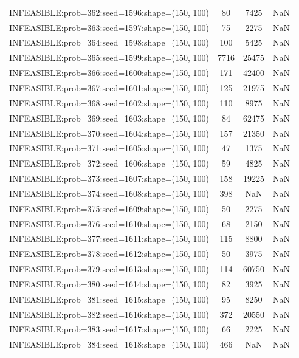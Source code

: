 \begin{longtable}{lccc}
INFEASIBLE:prob=362:seed=1596:shape=(150, 100) &    80 &  7425 &    NaN \\
INFEASIBLE:prob=363:seed=1597:shape=(150, 100) &    75 &  2275 &    NaN \\
INFEASIBLE:prob=364:seed=1598:shape=(150, 100) &   100 &  5425 &    NaN \\
INFEASIBLE:prob=365:seed=1599:shape=(150, 100) &  7716 & 25475 &    NaN \\
INFEASIBLE:prob=366:seed=1600:shape=(150, 100) &   171 & 42400 &    NaN \\
INFEASIBLE:prob=367:seed=1601:shape=(150, 100) &   125 & 21975 &    NaN \\
INFEASIBLE:prob=368:seed=1602:shape=(150, 100) &   110 &  8975 &    NaN \\
INFEASIBLE:prob=369:seed=1603:shape=(150, 100) &    84 & 62475 &    NaN \\
INFEASIBLE:prob=370:seed=1604:shape=(150, 100) &   157 & 21350 &    NaN \\
INFEASIBLE:prob=371:seed=1605:shape=(150, 100) &    47 &  1375 &    NaN \\
INFEASIBLE:prob=372:seed=1606:shape=(150, 100) &    59 &  4825 &    NaN \\
INFEASIBLE:prob=373:seed=1607:shape=(150, 100) &   158 & 19225 &    NaN \\
INFEASIBLE:prob=374:seed=1608:shape=(150, 100) &   398 &   NaN &    NaN \\
INFEASIBLE:prob=375:seed=1609:shape=(150, 100) &    50 &  2275 &    NaN \\
INFEASIBLE:prob=376:seed=1610:shape=(150, 100) &    68 &  2150 &    NaN \\
INFEASIBLE:prob=377:seed=1611:shape=(150, 100) &   115 &  8800 &    NaN \\
INFEASIBLE:prob=378:seed=1612:shape=(150, 100) &    50 &  3975 &    NaN \\
INFEASIBLE:prob=379:seed=1613:shape=(150, 100) &   114 & 60750 &    NaN \\
INFEASIBLE:prob=380:seed=1614:shape=(150, 100) &    82 &  3925 &    NaN \\
INFEASIBLE:prob=381:seed=1615:shape=(150, 100) &    95 &  8250 &    NaN \\
INFEASIBLE:prob=382:seed=1616:shape=(150, 100) &   372 & 20550 &    NaN \\
INFEASIBLE:prob=383:seed=1617:shape=(150, 100) &    66 &  2225 &    NaN \\
INFEASIBLE:prob=384:seed=1618:shape=(150, 100) &   466 &   NaN &    NaN \\

\end{longtable}
